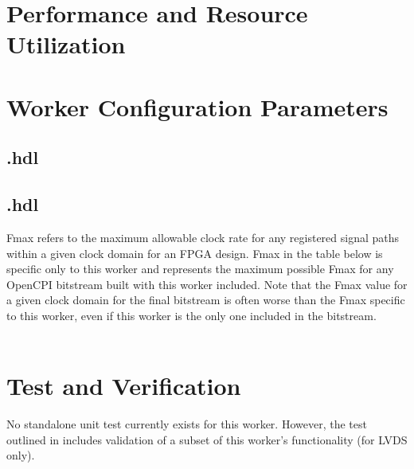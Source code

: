 \begin{landscape}
\section{Performance and Resource Utilization}
\section{Worker Configuration Parameters}
\subsection{\comp.hdl}
%
\subsection{\comp.hdl}
Fmax refers to the maximum allowable clock rate for any registered signal paths within a given clock domain for an FPGA design. Fmax in the table below is specific only to this worker and represents the maximum possible Fmax for any OpenCPI bitstream built with this worker included. Note that the Fmax value for a given clock domain for the final bitstream is often worse than the Fmax specific to this worker, even if this worker is the only one included in the bitstream. \\ \\

%


\end{landscape}


\section{Test and Verification}
No standalone unit test currently exists for this worker. However, the test outlined in \cite{dac_comp_datasheet} includes validation of a subset of this worker's functionality (for LVDS only).

